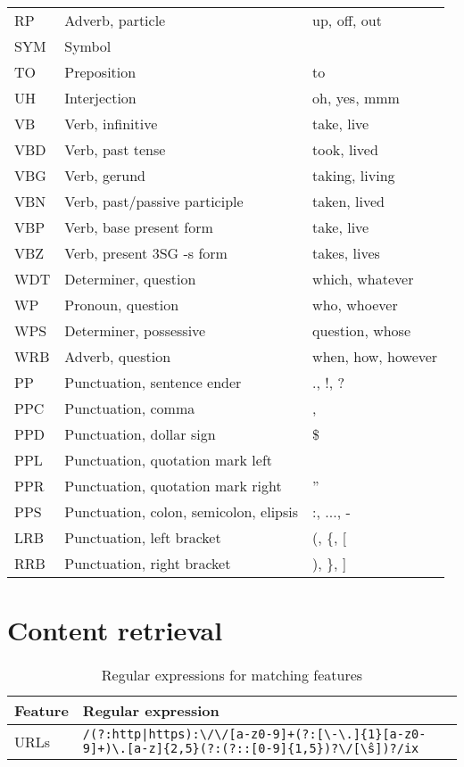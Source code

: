 \begin{center}
\begin{longtable}{ | l | l | l |}
  RP & Adverb, particle & up, off, out \\
  SYM & Symbol &  \\
  TO & Preposition & to \\
  UH & Interjection & oh, yes, mmm \\
  VB & Verb, infinitive & take, live \\
  VBD & Verb, past tense & took, lived \\
  VBG & Verb, gerund & taking, living \\
  VBN & Verb, past/passive participle & taken, lived \\
  VBP & Verb, base present form & take, live \\
  VBZ & Verb, present 3SG -s form & takes, lives \\
  WDT & Determiner, question & which, whatever \\
  WP & Pronoun, question & who, whoever \\
  WPS & Determiner, possessive & question, whose \\
  WRB & Adverb, question & when, how, however \\
  PP & Punctuation, sentence ender & ., !, ? \\
  PPC & Punctuation, comma  & , \\
  PPD & Punctuation, dollar sign & \$ \\
  PPL & Punctuation, quotation mark left & \\
  PPR & Punctuation, quotation mark right & '' \\
  PPS & Punctuation, colon, semicolon, elipsis & :, ..., - \\
  LRB & Punctuation, left bracket & (, \{, [ \\
  RRB & Punctuation, right bracket & ), \}, ] \\
	\hline
\end{longtable}
\end{center}

\section{Content retrieval}

\begin{center}
\begin{longtable}{ | l | p{4in} |}
	\caption{Regular expressions for matching features} \label{table:regex} \\
	\hline
	Feature & Regular expression \\
	\hline 
	URLs & \texttt{/(?:http|https):\textbackslash/\textbackslash/[a-z0-9]+(?:[\textbackslash-\textbackslash.]\{1\}[a-z0-9]+)\*\textbackslash\-.[a-z]\{2,5\}\-(?:(?::[0-9]\{1,5\})?\textbackslash/[\^\textbackslash s]\*)?/ix} \\
	\hline
\end{longtable}
\end{center}

